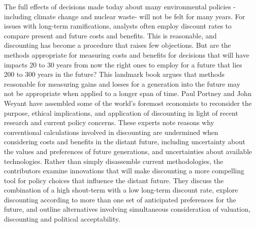 The full effects of decisions made today about many environmental policies -including climate change and nuclear waste- will not be felt for many years. For issues with long-term ramifications, analysts often employ discount rates to compare present and future costs and benefits. This is reasonable, and discounting has become a procedure that raises few objections. But are the methods appropriate for measuring costs and benefits for decisions that will have impacts 20 to 30 years from now the right ones to employ for a future that lies 200 to 300 years in the future? This landmark book argues that methods reasonable for measuring gains and losses for a generation into the future may not be appropriate when applied to a longer span of time. Paul Portney and John Weyant have assembled some of the world's foremost economists to reconsider the purpose, ethical implications, and application of discounting in light of recent research and current policy concerns. These experts note reasons why conventional calculations involved in discounting are undermined when considering costs and benefits in the distant future, including uncertainty about the values and preferences of future generations, and uncertainties about available technologies. Rather than simply disassemble current methodologies, the contributors examine innovations that will make discounting a more compelling tool for policy choices that influence the distant future. They discuss the combination of a high shout-term with a low long-term discount rate, explore discounting according to more than one set of anticipated preferences for the future, and outline alternatives involving simultaneous consideration of valuation, discounting and political acceptability.
